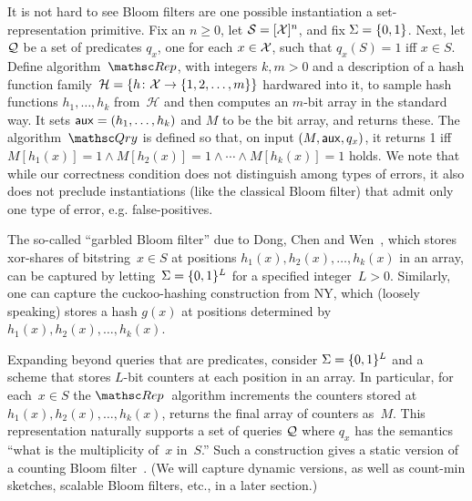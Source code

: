 It is not hard to see Bloom filters are one possible instantiation a set-representation primitive.
Fix an $n \geq 0$, let $\mathcal{S}=[{\cal X}]^n$, and fix $\Sigma=\{0,1\}$.  
Next, let ${\cal Q}$ be a set of predicates $q_x$, one for each $x \in {\cal X}$,
such that $q_x(S)=1$ iff $x \in S$.  Define algorithm~$\Rep$, with integers $k, m > 0$ and a description of a hash function family~$\mathcal{H}=\{h \colon {\cal X} \to \{1,2,\ldots,m\}\}$ hardwared into it, to sample hash functions $h_1, \ldots, h_k$ from~$\mathcal{H}$ and then computes an $m$-bit array in the standard way. It sets ${\sf aux} = (h_1, \ldots, h_k)$ and $M$ to be the bit array, and returns these.  The algorithm~$\Qry$ is defined so that, on input $(M,{\sf aux},q_x)$, it returns 1 iff $M[h_1(x)]=1 \wedge M[h_2(x)]=1 \wedge \cdots \wedge M[h_k(x)]=1$ holds.
We note that while our correctness condition does not distinguish among types of errors, it also does not preclude instantiations (like the classical Bloom filter) that admit only one type of error, e.g. false-positives.  

The so-called ``garbled Bloom filter'' due to Dong, Chen and Wen~\cite{xxx}, which stores xor-shares of bitstring~$x \in S$ at positions $h_1(x),h_2(x),\ldots,h_k(x)$ in an array, can be captured by letting~$\Sigma=\{0,1\}^L$ for a specified integer~$L>0$.  Similarly, one can capture the cuckoo-hashing construction from NY, which (loosely speaking) stores a hash $g(x)$ at positions determined by $h_1(x),h_2(x),\ldots,h_k(x)$.   

Expanding beyond queries that are predicates, consider $\Sigma=\{0,1\}^L$ and a scheme that stores $L$-bit counters at each position in an array.  In particular, for each~$x \in S$ the $\Rep$~algorithm increments the counters stored at $h_1(x),h_2(x),\ldots,h_k(x)$, returns the final array of counters as~$M$.  This representation naturally supports a set of queries ${\cal Q}$ where $q_x$ has the semantics ``what is the multiplicity of~$x$ in~$S$.''   Such a construction gives a static version of a counting Bloom filter~\cite{xxx}.  (We will capture dynamic versions, as well as count-min sketches, scalable Bloom filters, etc., in a later section.)
